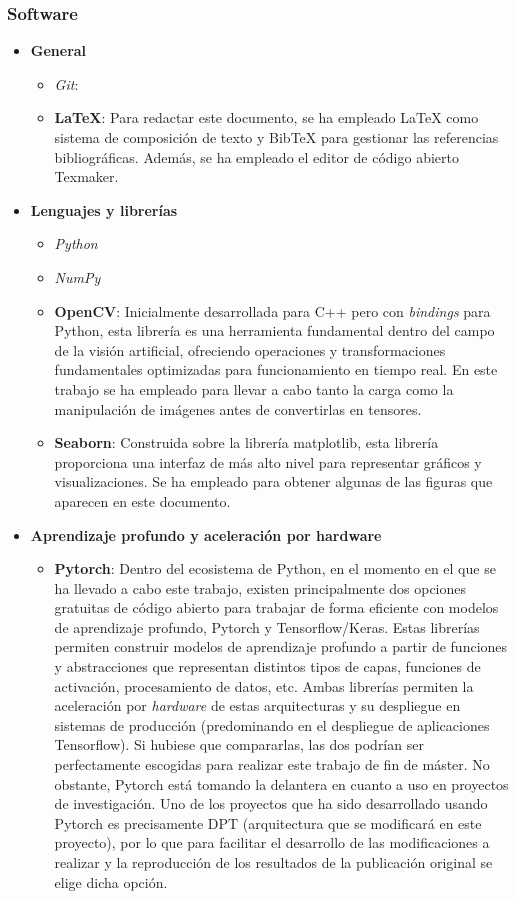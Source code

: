 \documentclass[a4paper, 11pt]{article}
\begin{document}
\subsubsection{Software}
\begin{itemize}
	\item \textbf{General}
	\begin{itemize}
		\item \textit{Git}:
		\item \textbf{\LaTeX}: Para redactar este documento, se ha empleado LaTeX como sistema de composición de texto y BibTeX para gestionar las referencias bibliográficas. Además, se ha empleado el editor de código abierto Texmaker.
	\end{itemize}
	\item \textbf{Lenguajes y librerías}
	\begin{itemize}
		\item \textit{Python}
		\item \textit{NumPy}
		\item \textbf{OpenCV}: Inicialmente desarrollada para C++ pero con \textit{bindings} para Python, esta librería es una herramienta fundamental dentro del campo de la visión artificial, ofreciendo operaciones y transformaciones fundamentales optimizadas para funcionamiento en tiempo real. En este trabajo se ha empleado para llevar a cabo tanto la carga como la manipulación de imágenes antes de convertirlas en tensores.
		\item \textbf{Seaborn}: Construida sobre la librería matplotlib, esta librería proporciona una interfaz de más alto nivel para representar gráficos y visualizaciones. Se ha empleado para obtener algunas de las figuras que aparecen en este documento.
	\end{itemize}
	\item \textbf{Aprendizaje profundo y aceleración por hardware}
	\begin{itemize}
		\item \textbf{Pytorch}: Dentro del ecosistema de Python, en el momento en el que se ha llevado a cabo este trabajo, existen principalmente dos opciones gratuitas de código abierto para trabajar de forma eficiente con modelos de aprendizaje profundo, Pytorch y Tensorflow/Keras. Estas librerías permiten construir modelos de aprendizaje profundo a partir de funciones y abstracciones que representan distintos tipos de capas, funciones de activación, procesamiento de datos, etc. Ambas librerías permiten la aceleración por \textit{hardware} de estas arquitecturas y su despliegue en sistemas de producción (predominando en el despliegue de aplicaciones Tensorflow). Si hubiese que compararlas, las dos podrían ser perfectamente escogidas para realizar este trabajo de fin de máster. No obstante, Pytorch está tomando la delantera en cuanto a uso en proyectos de investigación. Uno de los proyectos que ha sido desarrollado usando Pytorch es precisamente DPT \cite{visiontransformersDPT} (arquitectura que se modificará en este proyecto), por lo que para facilitar el desarrollo de las modificaciones a realizar y la reproducción de los resultados de la publicación original se elige dicha opción.

\end{itemize}
\end{itemize}
\end{document}
